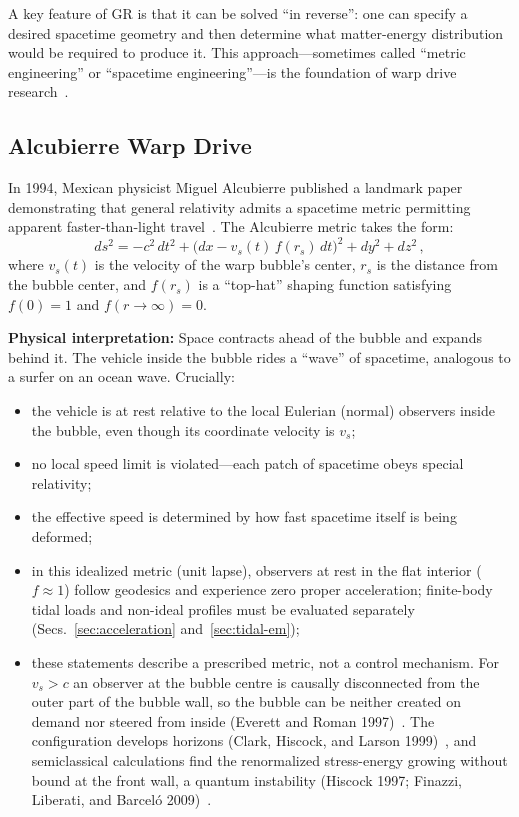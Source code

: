 \documentclass[aps,prd,twocolumn,superscriptaddress,nofootinbib,floatfix]{revtex4-2}
\begin{document}
A key feature of GR is that it can be solved ``in reverse'': one can specify a
desired spacetime geometry and then determine what matter-energy distribution
would be required to produce it. This approach---sometimes called ``metric
engineering'' or ``spacetime engineering''---is the foundation of warp drive
research~\cite{DIRD_Puthoff,MTW1973,Wald1984}.

\subsection{Alcubierre Warp Drive}\label{sec:alcubierre}

In 1994, Mexican physicist Miguel Alcubierre published a landmark paper
demonstrating that general relativity admits a spacetime metric permitting
apparent faster-than-light travel~\cite{Alcubierre1994}. The Alcubierre metric
takes the form:
\begin{equation}\label{eq:alcubierre}
  ds^{2} = -c^{2}\,dt^{2}
  + \bigl(dx - v_{s}(t)\,f(r_{s})\,dt\bigr)^{2}
  + dy^{2} + dz^{2}\,,
\end{equation}
where $v_{s}(t)$ is the velocity of the warp bubble's center, $r_{s}$ is the
distance from the bubble center, and $f(r_{s})$ is a ``top-hat'' shaping function
satisfying $f(0)=1$ and $f(r\to\infty)=0$.

\textbf{Physical interpretation:} Space contracts ahead of the bubble and expands
behind it. The vehicle inside the bubble rides a ``wave'' of spacetime, analogous
to a surfer on an ocean wave. Crucially:
\begin{itemize}
  \item the vehicle is at rest relative to the local Eulerian (normal) observers
        inside the bubble, even though its coordinate velocity is $v_{s}$;
  \item no local speed limit is violated---each patch of spacetime obeys special
        relativity;
  \item the effective speed is determined by how fast spacetime itself is being
        deformed;
  \item in this idealized metric (unit lapse), observers at rest in the flat
        interior ($f\approx1$) follow geodesics and experience zero proper
        acceleration; finite-body tidal loads and non-ideal profiles must be
        evaluated separately (Secs.~\ref{sec:acceleration}
        and~\ref{sec:tidal-em});
  \item these statements describe a prescribed metric, not a control mechanism.
        For $v_{s}>c$ an observer at the bubble centre is causally disconnected
        from the outer part of the bubble wall, so the bubble can be neither
        created on demand nor steered from inside (Everett and Roman
        1997)~\cite{EverettRoman1997}. The configuration develops horizons
        (Clark, Hiscock, and Larson 1999)~\cite{ClarkHiscockLarson1999}, and
        semiclassical calculations find the renormalized stress-energy growing
        without bound at the front wall, a quantum instability (Hiscock 1997;
        Finazzi, Liberati, and Barcel\'o 2009)~\cite{Hiscock1997,Finazzi2009}.
\end{itemize}
\end{document}
